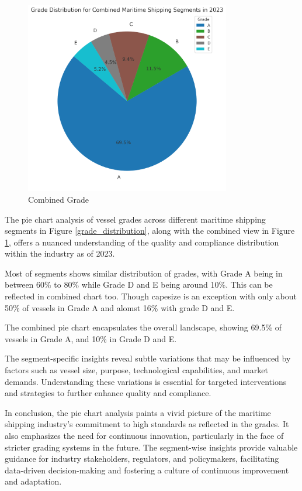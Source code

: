 \newpage
\begin{figure}[h]
    \centering
    \includegraphics[width=0.8\textwidth]{images/combined_grade.png}
    \caption{Combined Grade}
    \label{combined_grade}
\end{figure}

The pie chart analysis of vessel grades across different maritime shipping segments in Figure \ref{grade_distribution}, 
along with the combined view in Figure \ref{combined_grade}, offers a nuanced understanding of the quality and compliance distribution within the industry as of 2023.


Most of segments shows similar distribution of grades, with Grade A being in between 60\% to 80\% while Grade D and E being around 10\%.
This can be reflected in combined chart too. Though capesize is an exception with only about 50\% of vessels in Grade A and alomst 16\% with grade D and E.

The combined pie chart encapsulates the overall landscape, showing 69.5\% of vessels in Grade A, and 10\% in Grade D and E.

The segment-specific insights reveal subtle variations that may be influenced by factors such as vessel size, purpose, technological capabilities, and market demands. 
Understanding these variations is essential for targeted interventions and strategies to further enhance quality and compliance.

In conclusion, the pie chart analysis paints a vivid picture of the maritime shipping industry's commitment to high standards as reflected in the grades. 
It also emphasizes the need for continuous innovation, particularly in the face of stricter grading systems in the future. 
The segment-wise insights provide valuable guidance for industry stakeholders, regulators, and policymakers, facilitating data-driven decision-making and fostering a culture of continuous improvement and adaptation.


